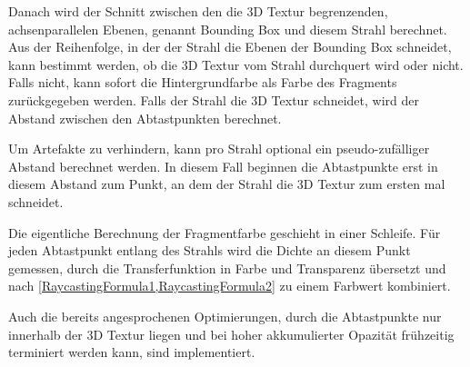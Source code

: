 \documentclass[a4paper,fontsize=12pt,toc=bib,parskip=half,ngerman]{scrartcl}
\begin{document}
Danach wird der Schnitt zwischen den die 3D Textur begrenzenden, achsenparallelen Ebenen, genannt \glq Bounding Box\grq{} und diesem Strahl berechnet. Aus der Reihenfolge, in der der Strahl die Ebenen der Bounding Box schneidet, kann bestimmt werden, ob die 3D Textur vom Strahl durchquert wird oder nicht. Falls nicht, kann sofort die Hintergrundfarbe als Farbe des Fragments zur\"uckgegeben werden. Falls der Strahl die 3D Textur schneidet, wird der Abstand zwischen den Abtastpunkten berechnet. 

Um Artefakte zu verhindern, kann pro Strahl optional ein pseudo-zuf\"alliger Abstand berechnet werden. In diesem Fall beginnen die Abtastpunkte erst in diesem Abstand zum Punkt, an dem der Strahl die 3D Textur zum ersten mal schneidet.

Die eigentliche Berechnung der Fragmentfarbe geschieht in einer Schleife. F\"ur jeden Abtastpunkt entlang des Strahls wird die Dichte an diesem Punkt gemessen, durch die Transferfunktion in Farbe und Transparenz  \"ubersetzt und nach \cref{RaycastingFormula1,RaycastingFormula2} zu einem Farbwert kombiniert. 

Auch die bereits angesprochenen Optimierungen, durch die Abtastpunkte nur innerhalb der 3D Textur liegen und bei hoher akkumulierter Opazit\"at fr\"uhzeitig terminiert werden kann, sind implementiert.
\end{document}
